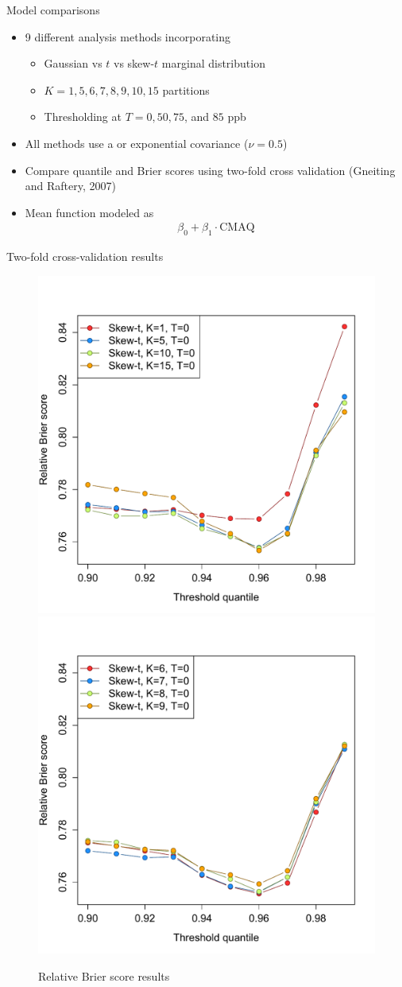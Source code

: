 \documentclass{beamer}
\begin{document}
\begin{frame}{Model comparisons}
  \begin{itemize} \setlength{\itemsep}{0.5em}
    \item 9 different analysis methods incorporating
    \begin{itemize}
      \item Gaussian vs $t$ vs skew-$t$ marginal distribution
      \item $K=1, 5, 6, 7, 8, 9, 10, 15$ partitions
      \item Thresholding at $T=0, 50, 75$, and $85$ ppb
    \end{itemize}
    \item All methods use a \Matern or exponential covariance ($\nu = 0.5$)
    \item Compare quantile and Brier scores using two-fold cross validation (Gneiting and Raftery, 2007)
    \item Mean function modeled as
    \begin{align*}
    	\beta_0 + \beta_1 \cdot \text{CMAQ}
    \end{align*}
   \end{itemize}
\end{frame}

\begin{frame}{Two-fold cross-validation results}
  \centering
  \begin{figure}
    \includegraphics[width=0.45\linewidth]{./plots/pot/bs-ozone-1.pdf}
    \includegraphics[width=0.45\linewidth]{./plots/pot/bs-ozone-2.pdf} \\
    \caption{Relative Brier score results}
  \end{figure}
\end{frame}
\end{document}
